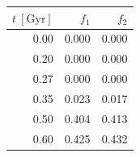\begin{tabular}{rrr}\toprule
$t\ [\mathrm{Gyr}]$ & $f_1$ & $f_2$ \\
\midrule
0.00 & 0.000 & 0.000 \\
0.20 & 0.000 & 0.000 \\
0.27 & 0.000 & 0.000 \\
0.35 & 0.023 & 0.017 \\
0.50 & 0.404 & 0.413 \\
0.60 & 0.425 & 0.432 \\
\bottomrule\end{tabular}
